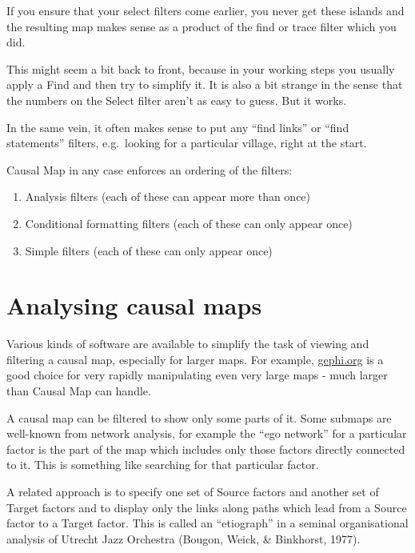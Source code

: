 \documentclass[
]{book}
\begin{document}
If you ensure that your select filters come earlier, you never get these islands and the resulting map makes sense as a product of the find or trace filter which you did.

This might seem a bit back to front, because in your working steps you usually apply a Find and then try to simplify it. It is also a bit strange in the sense that the numbers on the Select filter aren't as easy to guess. But it works.

In the same vein, it often makes sense to put any ``find links'' or ``find statements'' filters, e.g.~looking for a particular village, right at the start.

Causal Map in any case enforces an ordering of the filters:

\begin{enumerate}
\def\labelenumi{\arabic{enumi})}
\item
  Analysis filters (each of these can appear more than once)
\item
  Conditional formatting filters (each of these can only appear once)
\item
  Simple filters (each of these can only appear once)
\end{enumerate}

\hypertarget{xanalysis}{%
\chapter{Analysing causal maps}\label{xanalysis}}

Various kinds of software are available to simplify the task of viewing and filtering a causal map, especially for larger maps. For example, \href{http://gephi.org}{gephi.org} is a good choice for very rapidly manipulating even very large maps - much larger than Causal Map can handle.

A causal map can be filtered to show only some parts of it. Some submaps are well-known from network analysis, for example the ``ego network'' for a particular factor is the part of the map which includes only those factors directly connected to it. This is something like searching for that particular factor.

A related approach is to specify one set of Source factors and another set of Target factors and to display only the links along paths which lead from a Source factor to a Target factor. This is called an ``etiograph'' in a seminal organisational analysis of Utrecht Jazz Orchestra (Bougon, Weick, \& Binkhorst, 1977).
\end{document}
